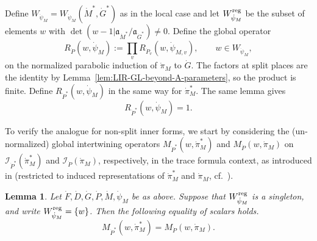 \documentclass[11pt,reqno]{amsart}
\theoremstyle{plain}
\newtheorem{lem}[thm]{Lemma}
\theoremstyle{definition}
\newcommand{\fka}{{\mathfrak a}}
\newcommand{\cI}{\mathcal{I}}
\newcommand{\tu}{\textup}
\numberwithin{equation}{subsection}
\begin{document}
Define $W_{\dot\psi_M}=W_{\dot\psi_M}(\dot M^*,\dot G^*)$
as in the local case and let $W^{\tu{reg}}_{\dot\psi_M}$ be the
subset of elements $w$ with
$\det(w-1|\fka_{\dot M^*}/\fka_{\dot G^*})\ne0$.
Define the global operator
\[
R_{\dot P}(w,\dot \psi_M):=\prod_v R_{\dot P_v}(w,\dot \psi_{M,v}), \qquad w\in W_{\dot\psi_M}, 
\]
on the normalized parabolic induction of $\dot\pi_M$ to $\dot G$.
The factors at split places are the identity by
Lemma~\ref{lem:LIR-GL-beyond-A-parameters}, so the product is finite.
Define $R_{\dot P^*}(w,\dot\psi_M)$ in the same way for $\dot\pi_M^*$.
The same lemma gives
\begin{equation}\label{eq:R(w)=1-GL(N)}
    R_{\dot P^*}(w,\dot \psi_M)=1.
\end{equation}

To verify the analogue for non-split inner forms, we start by considering the (un-normalized) global intertwining operators $M_{\dot P^*}(w,\dot\pi^*_M)$ and $M_{\dot P}(w,\dot\pi_M)$ on $\cI_{\dot P^*}(\dot \pi^*_M)$ and $\cI_{\dot P}(\dot \pi_M)$, respectively, in the trace formula context, as introduced in \cite[(3.1.6)]{Arthur} (restricted to induced representations of $\dot \pi^*_M$ and $\dot \pi_M$, cf.~\cite[p.182]{Arthur}).
\begin{lem}\label{lem:Global-Intertwining-Relation}
Let $\dot F, \dot D, \dot G, \dot P, \dot M, \dot\psi_M$ be as above. Suppose that $W^{\tu{reg}}_{\dot\psi_M}$ is a singleton, and write $W^{\tu{reg}}_{\dot\psi_M}=\{w\}$. Then the following equality of scalars holds.
\[
M_{\dot P^*}(w,\dot\pi^*_M)=M_{\dot P}(w,\dot\pi_M).
\]
\end{lem}
\end{document}
